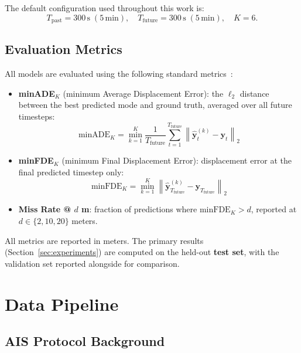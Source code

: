 \documentclass[12pt, a4paper]{article}
\begin{document}
  The default configuration used throughout this work is:
  \[
      T_{\text{past}} = 300\,\text{s}\;(5\,\text{min}),
      \quad T_{\text{future}} = 300\,\text{s}\;(5\,\text{min}),
      \quad K = 6.
  \]

  \subsection{Evaluation Metrics}
  \label{sec:metrics}

  All models are evaluated using the following standard metrics~\citep{feng2024unitraj}:

  \begin{itemize}
      \item \textbf{minADE$_K$} (minimum Average Displacement Error): the $\ell_2$ distance between the best predicted mode and ground truth, averaged over all future timesteps:
      \[
          \text{minADE}_K = \min_{k=1}^{K} \frac{1}{T_{\text{future}}} \sum_{t=1}^{T_{\text{future}}} \left\| \hat{\mathbf{y}}^{(k)}_t - \mathbf{y}_t \right\|_2
      \]

      \item \textbf{minFDE$_K$} (minimum Final Displacement Error): displacement error at the final predicted timestep only:
      \[
          \text{minFDE}_K = \min_{k=1}^{K} \left\| \hat{\mathbf{y}}^{(k)}_{T_{\text{future}}} - \mathbf{y}_{T_{\text{future}}} \right\|_2
      \]


      \item \textbf{Miss Rate @ $d$ m}: fraction of predictions where $\text{minFDE}_K > d$, reported at $d \in \{2, 10, 20\}$ meters.
  \end{itemize}

  All metrics are reported in meters.  The primary results
  (Section~\ref{sec:experiments}) are computed on the held-out \textbf{test set},
  with the validation set reported alongside for comparison.

  \section{Data Pipeline}
  \label{sec:pipeline}


  \subsection{AIS Protocol Background}
  \label{sec:ais_background}
\end{document}
